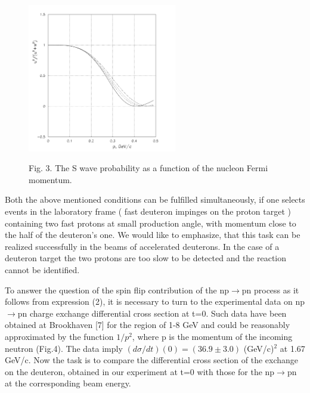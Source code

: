 \documentclass[a4paper,12pt]{article}
\begin{document}
\begin{figure}[hbt]
  \begin{center}
    \includegraphics[width=6.5cm]{wavedtr.pdf}
  \end{center}
  \vspace{0,4mm}
  \noindent
  Fig. 3. The S wave probability as a function of the nucleon Fermi momentum. \\
\end{figure}

Both the above mentioned conditions can be fulfilled simultaneously, if one
selects events in the laboratory frame ( fast deuteron impinges on the proton
target ) containing two fast protons  at small production angle, with momentum
close to the half of the deuteron's one. We would like to emphasize, that this
task can be realized successfully in the beams of accelerated deuterons. In the
case of a deuteron target the two protons are too slow to be detected and the
reaction cannot be identified.

To answer the question of the spin flip contribution of the np$\to$pn
process as it follows from expression (2), it is necessary to turn to the
experimental data on np$\to$pn
charge exchange differential cross section at t=0. Such data have been obtained
at Brookhaven [7] for
the region of 1-8 GeV and could be reasonably approximated by the function
$1/p^2$, where p is the momentum of the incoming neutron (Fig.4). The data imply
$(d\sigma /dt)(0) = (36.9 \pm 3.0)$ (GeV/c)$^2$ at 1.67 GeV/c. Now the task is
to compare the differential cross section of the exchange on the deuteron,
obtained in our experiment at t=0 with those for the np$\to$pn
at the corresponding beam energy.
\end{document}

